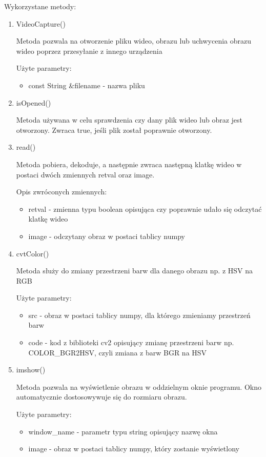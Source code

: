 \documentclass{article}
\begin{document}
Wykorzystane metody:
\begin{enumerate}
\item VideoCapture() \cite{opencv1}

Metoda pozwala na otworzenie pliku wideo, obrazu lub uchwycenia obrazu wideo poprzez przesyłanie z innego urządzenia

Użyte parametry:
\begin{itemize}
\item const String \&filename - nazwa pliku
\end{itemize}

\item isOpened() \cite{opencv2}

Metoda używana w celu sprawdzenia czy dany plik wideo lub obraz jest otworzony. Zwraca true, jeśli plik został poprawnie otworzony.

\item read() \cite{opencv3}

Metoda pobiera, dekoduje, a następnie zwraca następną klatkę wideo w postaci dwóch zmiennych retval oraz image.

Opis zwróconych zmiennych:
\begin{itemize}
\item retval - zmienna typu boolean opisująca czy poprawnie udało się odczytać klatkę wideo
\item image - odczytany obraz w postaci tablicy numpy
\end{itemize}

\item cvtColor() \cite{opencv4}

Metoda służy do zmiany przestrzeni barw dla danego obrazu np. z HSV na RGB

Użyte parametry:
\begin{itemize}

\item src - obraz w postaci tablicy numpy, dla którego zmieniamy przestrzeń barw
\item code - kod z biblioteki cv2 opisujący zmianę przestrzeni barw np. COLOR\_BGR2HSV, czyli zmiana z barw BGR na HSV

\end{itemize}

\item imshow() \cite{opencv5}

Metoda pozwala na wyświetlenie obrazu w oddzielnym oknie programu. Okno automatycznie dostosowywuje się do rozmiaru obrazu.

Użyte parametry:
\begin{itemize}
\item window\_name - parametr typu string opisujący nazwę okna
\item image - obraz w postaci tablicy numpy, który zostanie wyświetlony
\end{itemize}


\end{enumerate}
\end{document}
